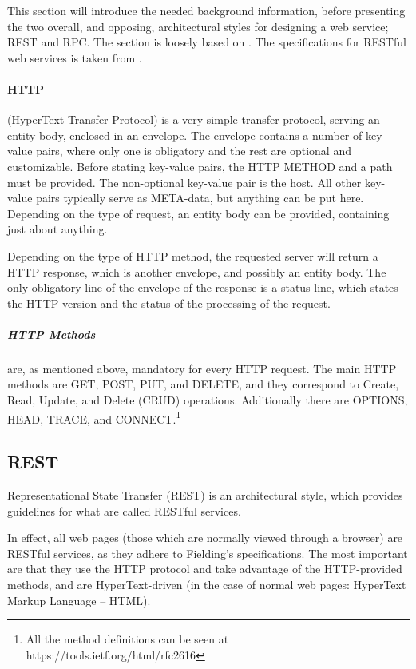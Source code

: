 This section will introduce the needed background information, before presenting the two overall, and opposing, architectural styles for designing a web service; REST and RPC.
The section is loosely based on \citet{restful_web_services}.
The specifications for RESTful web services is taken from \citet{fielding_dissertation}.

\paragraph{HTTP} (HyperText Transfer Protocol) is a very simple transfer protocol, serving an entity body, enclosed in an envelope.
The envelope contains a number of key-value pairs, where only one is obligatory and the rest are optional and customizable.
Before stating key-value pairs, the HTTP METHOD and a path must be provided.
The non-optional key-value pair is the host.
All other key-value pairs typically serve as META-data, but anything can be put here.
Depending on the type of request, an entity body can be provided, containing just about anything.

Depending on the type of HTTP method, the requested server will return a HTTP response, which is another envelope, and possibly an entity body.
The only obligatory line of the envelope of the response is a status line, which states the HTTP version and the status of the processing of the request.

\subparagraph{HTTP Methods} are, as mentioned above, mandatory for every HTTP request.
The main HTTP methods are GET, POST, PUT, and DELETE, and they correspond to Create, Read, Update, and Delete (CRUD) operations.
Additionally there are OPTIONS, HEAD, TRACE, and CONNECT.\footnote{All the method definitions can be seen at https://tools.ietf.org/html/rfc2616}

\subsection{REST}
Representational State Transfer (REST) is an architectural style, which provides guidelines for what are called RESTful services.

In effect, all web pages (those which are normally viewed through a browser) are RESTful services, as they adhere to Fielding's specifications.
The most important are that they use the HTTP protocol and take advantage of the HTTP-provided methods, and are HyperText-driven (in the case of normal web pages: HyperText Markup Language -- HTML).

